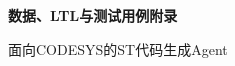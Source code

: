\documentclass[UTF8,a4paper,zihao=5]{ctexart}
\begin{document}
\begin{titlepage}
  \centering
  \vspace*{4cm}
  {\bfseries 数据、LTL与测试用例附录\par}
  \vspace{1.2cm}
  {面向CODESYS的ST代码生成Agent\par}
  \vfill
  \vspace{2cm}
\end{titlepage}

\tableofcontents
\clearpage


\end{document}

